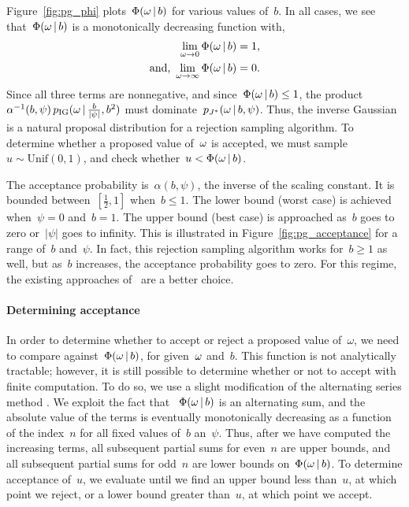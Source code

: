Figure~\ref{fig:pg_phi} plots~$\Phi({\omega} \,|\, b)$ for various values of~$b$.
In all cases, we see that~$\Phi({\omega} \,|\, b)$ is a monotonically
decreasing function with,
\begin{align*}
  \lim_{\omega \to 0} \Phi(\omega \,|\, b) &= 1, \\
  \text{and, }
  \lim_{\omega \to \infty} \Phi(\omega \,|\, b) &= 0.
\end{align*}
Since all three terms are nonnegative, and since~${\Phi({\omega} \,|\,
  b) \leq 1}$, the product~${\alpha^{-1}(b,\psi)\,
  p_{\mathrm{IG}}({\omega} \,|\, \tfrac{b}{|\psi|}, b^2)}$
must dominate~$p_{J^{*}}({\omega} \,|\, b,\psi)$.  Thus, the inverse
Gaussian is a natural proposal distribution for a rejection sampling
algorithm.  To determine whether a proposed value of~${\omega}$ is
accepted, we must sample~${u \sim \mathrm{Unif}(0,1)}$, and check
whether~$u < \Phi({\omega} \,|\, b)$.

The acceptance probability is~$\alpha(b,\psi)$, the inverse of the
scaling constant. It is bounded between~$[\tfrac{1}{2}, 1]$ when~${b
  \leq 1}$.  The lower bound (worst case) is achieved when~${\psi=0}$
and~${b=1}$.  The upper bound (best case) is approached as~$b$ goes to
zero or~$|\psi|$ goes to infinity.  This is illustrated in
Figure~\ref{fig:pg_acceptance} for a range of~$b$ and~$\psi$.
In fact, this rejection sampling algorithm works for~$b \geq 1$ as well,
but as~$b$ increases, the acceptance probability goes to zero. For
this regime, the existing approaches of~\citet{windle2014sampling} are
a better choice.

\paragraph{Determining acceptance}
In order to determine whether to accept or reject a proposed value
of~$\omega$, we need to compare against~${\Phi({\omega} \,|\, b)}$, for
given~${\omega}$ and~$b$. This function is not analytically tractable;
however, it is still possible to determine whether or not to accept
with finite computation. To do so, we use a slight modification of the
alternating series method \citep{devroye1986}.  We exploit the
fact that ~$\Phi({\omega} \,|\, b)$ is an alternating sum, and the
absolute value of the terms is eventually monotonically decreasing as
a function of the index~$n$ for all fixed values of~$b$ an~$\psi$.
Thus, after we have computed the increasing terms, all subsequent
partial sums for even~$n$ are upper bounds, and all subsequent partial
sums for odd~$n$ are lower bounds on~$\Phi({\omega}\,|\, b)$.  To
determine acceptance of~$u$, we evaluate until we find an upper bound
less than~$u$, at which point we reject, or a lower bound greater
than~$u$, at which point we accept. 

